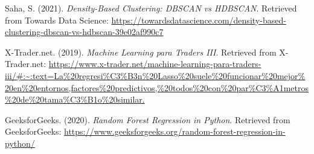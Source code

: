 \documentclass{wsdcr}
\begin{document}
\begin{thebibliography}{9}
    Saha, S. (2021).
    \textit{Density-Based Clustering: DBSCAN vs HDBSCAN}.
    Retrieved from Towards Data Science: \url{https://towardsdatascience.com/density-based-clustering-dbscan-vs-hdbscan-39e02af990c7}

    X-Trader.net. (2019).
    \textit{Machine Learning para Traders III}.
    Retrieved from X-Trader.net: \url{https://www.x-trader.net/machine-learning-para-traders-iii/#:~:text=La%20regresi%C3%B3n%20Lasso%20suele%20funcionar%20mejor%20en%20entornos,factores%20predictivos,%20todos%20con%20par%C3%A1metros%20de%20tama%C3%B1o%20similar.}

    GeeksforGeeks. (2020).
    \textit{Random Forest Regression in Python}.
    Retrieved from GeeksforGeeks: \url{https://www.geeksforgeeks.org/random-forest-regression-in-python/}
\end{thebibliography}







\end{document}
